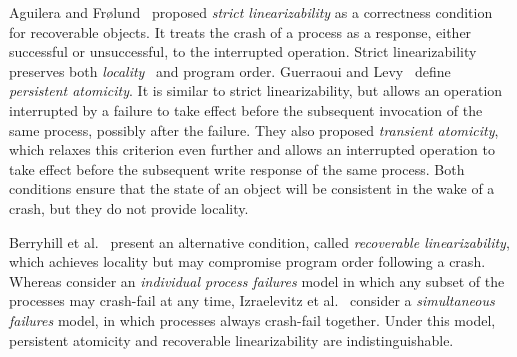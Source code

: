 Aguilera and Fr{\o}lund~\cite{Aguilera2003StrictLA} proposed \emph{strict
linearizability} as a correctness condition for recoverable objects.
It treats the crash of a process as a response,
either successful or unsuccessful, to the interrupted operation.
Strict linearizability preserves both \emph{locality}~\cite{herlihy91waitfree}
and program order.
Guerraoui and Levy~\cite{DBLP:conf/icdcs/GuerraouiL04} define
\emph{persistent atomicity}. It is similar to strict linearizability,
but allows an operation interrupted by a failure to take effect before
the subsequent invocation of the same process, possibly after the failure.
They also proposed \emph{transient atomicity}, which relaxes this criterion
even further and allows an interrupted operation to take effect before
the subsequent write response of the same process.
Both conditions ensure that the state of an object will be consistent
in the wake of a crash, but they do not provide locality.

Berryhill et al.~\cite{DBLP:conf/opodis/BerryhillGT15} present an
alternative condition, called \emph{recoverable linearizability},
which achieves locality but may compromise program order following a crash.
Whereas \cite{Aguilera2003StrictLA,DBLP:conf/opodis/BerryhillGT15,DBLP:conf/icdcs/GuerraouiL04}
consider an \emph{individual process failures} model in which any subset
of the processes may crash-fail at any time,
Izraelevitz et al.~\cite{DBLP:conf/wdag/IzraelevitzMS16} consider a
\emph{simultaneous failures} model, in which processes always crash-fail together.
Under this model, persistent atomicity and recoverable linearizability are
indistinguishable. 

